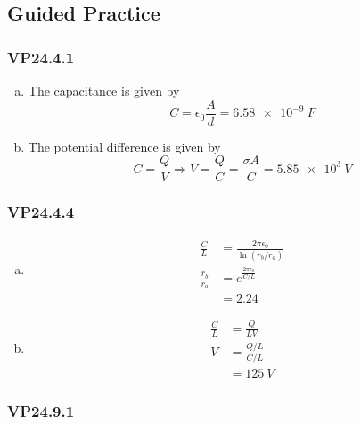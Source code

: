 \documentclass{article}
\begin{document}
\subsection{Guided Practice}

\subsubsection{VP24.4.1}

\begin{enumerate}[(a)]
  \item The capacitance is given by \[C = \epsilon_0 \frac{A}{d} = \qty{6.58e-9}{F}\]

  \item The potential difference is given by \[C = \frac{Q}{V} \Rightarrow V = \frac{Q}{C} = \frac{\sigma A}{C} = \qty{5.85e3}{V}\]
\end{enumerate}

\subsubsection{VP24.4.4}

\begin{enumerate}[(a)]
  \item

        \begin{align*}
          \frac{C}{L}     & = \frac{2 \pi \epsilon_0}{\ln (r_b / r_a)} \\
          \frac{r_b}{r_a} & = e^{\frac{2 \pi \epsilon_0}{C / L}}       \\
                          & = 2.24
        \end{align*}

  \item

        \begin{align*}
          \frac{C}{L} & = \frac{Q}{L V}       \\
          V           & = \frac{Q / L}{C / L} \\
                      & = \qty{125}{V}
        \end{align*}
\end{enumerate}

\subsubsection{VP24.9.1}
\end{document}
